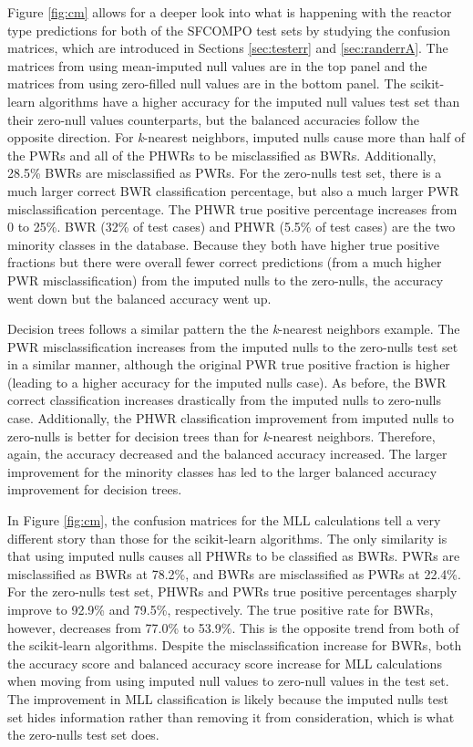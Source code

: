 Figure \ref{fig:cm} allows for a deeper look into what is happening with the
reactor type predictions for both of the \gls{SFCOMPO} test sets by studying
the confusion matrices, which are introduced in Sections \ref{sec:testerr} and
\ref{sec:randerrA}.  The matrices from using mean-imputed null values are in
the top panel and the matrices from using zero-filled null values are in the
bottom panel.  The scikit-learn algorithms have a higher accuracy for the
imputed null values test set than their zero-null values counterparts, but the
balanced accuracies follow the opposite direction. For \textit{k}-nearest
neighbors, imputed nulls cause more than half of the \gls{PWR}s and all of the
\gls{PHWR}s to be misclassified as \gls{BWR}s. Additionally, 28.5\% \gls{BWR}s
are misclassified as \gls{PWR}s.  For the zero-nulls test set, there is a much
larger correct \gls{BWR} classification percentage, but also a much larger
\gls{PWR} misclassification percentage. The \gls{PHWR} true positive percentage
increases from 0 to 25\%.  \Gls{BWR} (32\% of test cases) and \gls{PHWR} (5.5\%
of test cases) are the two minority classes in the database.  Because they both
have higher true positive fractions but there were overall fewer correct
predictions (from a much higher \gls{PWR} misclassification) from the imputed
nulls to the zero-nulls, the accuracy went down but the balanced accuracy went
up.

Decision trees follows a similar pattern the the \textit{k}-nearest neighbors
example.  The \gls{PWR} misclassification increases from the imputed nulls to
the zero-nulls test set in a similar manner, although the original \gls{PWR}
true positive fraction is higher (leading to a higher accuracy for the imputed
nulls case).  As before, the \gls{BWR} correct classification increases
drastically from the imputed nulls to zero-nulls case.  Additionally, the
\gls{PHWR} classification improvement from imputed nulls to zero-nulls is better
for decision trees than for \textit{k}-nearest neighbors.  Therefore, again,
the accuracy decreased and the balanced accuracy increased. The larger
improvement for the minority classes has led to the larger balanced accuracy
improvement for decision trees.

In Figure \ref{fig:cm}, the confusion matrices for the \gls{MLL} calculations
tell a very different story than those for the scikit-learn algorithms.  The
only similarity is that using imputed nulls causes all \gls{PHWR}s to be
classified as \gls{BWR}s. \gls{PWR}s are misclassified as \gls{BWR}s at 78.2\%,
and \gls{BWR}s are misclassified as \gls{PWR}s at 22.4\%. For the zero-nulls
test set, \gls{PHWR}s and \gls{PWR}s true positive percentages sharply improve
to 92.9\% and 79.5\%, respectively.  The true positive rate for \gls{BWR}s,
however, decreases from 77.0\% to 53.9\%. This is the opposite trend from both
of the scikit-learn algorithms.  Despite the misclassification increase for
\gls{BWR}s, both the accuracy score and balanced accuracy score increase for
\gls{MLL} calculations when moving from using imputed null values to zero-null
values in the test set. The improvement in \gls{MLL} classification is likely
because the imputed nulls test set hides information rather than removing it
from consideration, which is what the zero-nulls test set does. 

